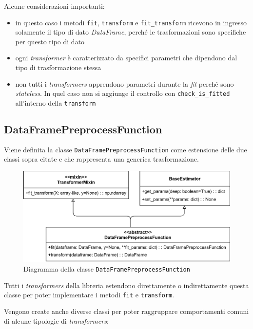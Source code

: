 Alcune considerazioni importanti:

\begin{itemize}
    \item in questo caso i metodi \texttt{fit}, \texttt{transform} e \texttt{fit\_transform} ricevono in ingresso solamente il tipo di dato \textit{DataFrame}, perché le trasformazioni sono specifiche per questo tipo di dato
    \item ogni \textit{transformer} è caratterizzato da specifici parametri che dipendono dal tipo di trasformazione stessa
    \item non tutti i \textit{transformers} apprendono parametri durante la \textit{fit} perché sono \textit{stateless}. In quel caso non si aggiunge il controllo con \texttt{check\_is\_fitted} all'interno della \texttt{transform}
\end{itemize}

\subsection{DataFramePreprocessFunction}

Viene definita la classe \texttt{DataFramePreprocessFunction} come estensione delle due classi sopra citate e che rappresenta una generica trasformazione.

\begin{figure}[H]
    \centering
    \includegraphics[scale=0.2]{figures/UML/preprocessing/dataframe_preprocess_function.png}
    \caption{Diagramma della classe \texttt{DataFramePreprocessFunction}}
\end{figure}

Tutti i \textit{transformers} della libreria estendono direttamente o indirettamente questa classe per poter implementare i metodi \texttt{fit} e \texttt{transform}. 

Vengono create anche diverse classi per poter raggruppare comportamenti comuni di alcune tipologie di \textit{transformers}:

